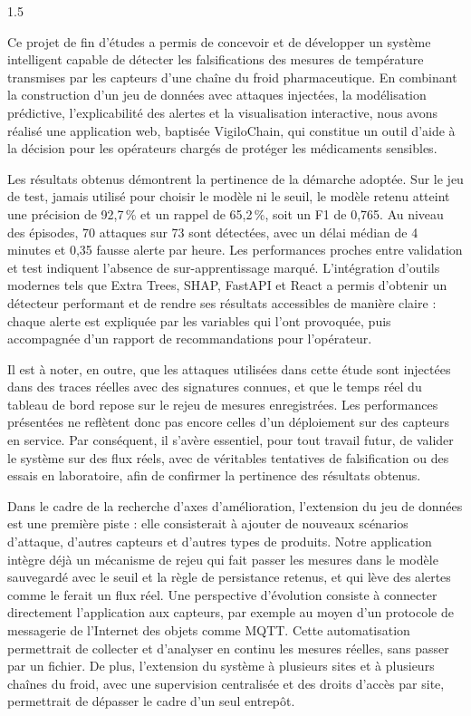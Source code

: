 \begin{spacing}{1.5}
\vspace{1cm}
\label{chap:ConclusionPers}
\rhead{\thepage}

Ce projet de fin d'études a permis de concevoir et de développer un système
intelligent capable de détecter les falsifications des mesures de température
transmises par les capteurs d'une chaîne du froid pharmaceutique. En combinant
la construction d'un jeu de données avec attaques injectées, la modélisation
prédictive, l'explicabilité des alertes et la visualisation interactive, nous
avons réalisé une application web, baptisée VigiloChain, qui constitue un outil
d'aide à la décision pour les opérateurs chargés de protéger les médicaments
sensibles.

Les résultats obtenus démontrent la pertinence de la démarche adoptée. Sur le
jeu de test, jamais utilisé pour choisir le modèle ni le seuil, le modèle retenu
atteint une précision de 92,7\,\% et un rappel de 65,2\,\%, soit un F1 de 0,765.
Au niveau des épisodes, 70 attaques sur 73 sont détectées, avec un délai médian
de 4 minutes et 0,35 fausse alerte par heure. Les performances proches entre
validation et test indiquent l'absence de sur-apprentissage marqué. L'intégration
d'outils modernes tels que Extra Trees, SHAP, FastAPI et React a permis d'obtenir
un détecteur performant et de rendre ses résultats accessibles de manière claire :
chaque alerte est expliquée par les variables qui l'ont provoquée, puis
accompagnée d'un rapport de recommandations pour l'opérateur.

Il est à noter, en outre, que les attaques utilisées dans cette étude sont
injectées dans des traces réelles avec des signatures connues, et que le temps
réel du tableau de bord repose sur le rejeu de mesures enregistrées. Les
performances présentées ne reflètent donc pas encore celles d'un déploiement sur
des capteurs en service. Par conséquent, il s'avère essentiel, pour tout travail
futur, de valider le système sur des flux réels, avec de véritables tentatives de
falsification ou des essais en laboratoire, afin de confirmer la pertinence des
résultats obtenus.

Dans le cadre de la recherche d'axes d'amélioration, l'extension du jeu de
données est une première piste : elle consisterait à ajouter de nouveaux
scénarios d'attaque, d'autres capteurs et d'autres types de produits.
Notre application intègre déjà un mécanisme de rejeu qui fait passer les
mesures dans le modèle sauvegardé avec le seuil et la règle de persistance
retenus, et qui lève des alertes comme le ferait un flux réel. Une perspective
d'évolution consiste à connecter directement l'application aux capteurs, par
exemple au moyen d'un protocole de messagerie de l'Internet des objets comme MQTT.
Cette automatisation permettrait de collecter et d'analyser en continu les
mesures réelles, sans passer par un fichier. De plus, l'extension du système à
plusieurs sites et à plusieurs chaînes du froid, avec une supervision centralisée
et des droits d'accès par site, permettrait de dépasser le cadre d'un seul
entrepôt.


\end{spacing}
